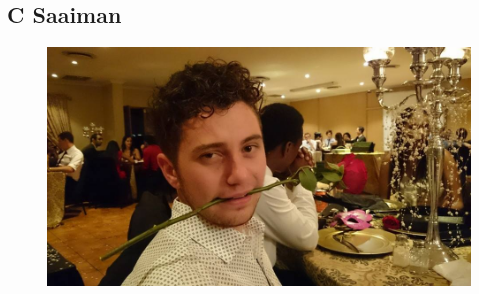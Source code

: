 \documentclass{article}
\begin{document}
		\subsection{C Saaiman}
	\begin{figure}[h]
		\centering
		\includegraphics[height=0.3\textheight]{Saaiman.jpg}
	\end{figure}
    
\end{document}

